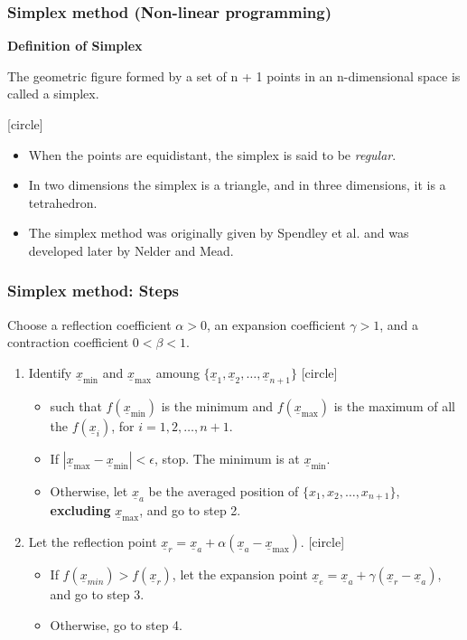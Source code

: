 \documentclass{beamer}
\begin{document}
\begin{frame}
    \frametitle{Simplex method (Non-linear programming)}
    \textbf{Definition of Simplex}

    The geometric figure formed by a set of n + 1 points in an
    n-dimensional space is called a simplex.

    [circle]
    \begin{itemize}
        \item When the points are equidistant, the simplex is said to be \textit{regular}.
        \item In two dimensions the simplex is a triangle, and in three dimensions, it is a tetrahedron.
        \item The simplex method was originally given by Spendley et al. and was developed later by Nelder and Mead.
    \end{itemize}    
\end{frame}

\begin{frame}
    \frametitle{Simplex method: Steps}
    Choose a reflection coefficient $\alpha>0$, an expansion coefficient $\gamma>1$, and a contraction coefficient $0<\beta<1$.
    \hfill \break
    \begin{enumerate}
        \item Identify $\underline{x}_{\min}$ and $\underline{x}_{\max}$ amoung
            $\{\underline{x}_1, \underline{x}_2,\dots,\underline{x}_{n+1}\}$
            [circle]
            \begin{itemize}
                \item such that $f(\underline{x}_{\min})$ is the minimum
                and $f(\underline{x}_{\max})$ is the maximum
                of all the $f(\underline{x}_i)$, for $i=1, 2, \dots,n+1$.
                \item If $|\underline{x}_{\max}-\underline{x}_{\min}|<\epsilon$, stop.
                The minimum is at $\underline{x}_{\min}$.
                \item Otherwise, let $\underline{x}_a$ be the averaged position of $\{x_1, x_2, \dots, x_{n+1}\}$,
                \textbf{excluding} $\underline{x}_{\max}$, and go to step 2.
            \end{itemize}
        \item Let the reflection point $\underline{x}_r=\underline{x}_a+\alpha (\underline{x}_a-\underline{x}_{\max})$.
        [circle]
        \begin{itemize}
            \item If $f(\underline{x}_{min})>f(\underline{x}_{r})$, let the expansion point $\underline{x}_e=\underline{x}_a+\gamma (\underline{x}_r-\underline{x}_a)$,
            and go to step 3.
            \item Otherwise, go to step 4.
        \end{itemize}
    \end{enumerate}
\end{frame}
\end{document}
